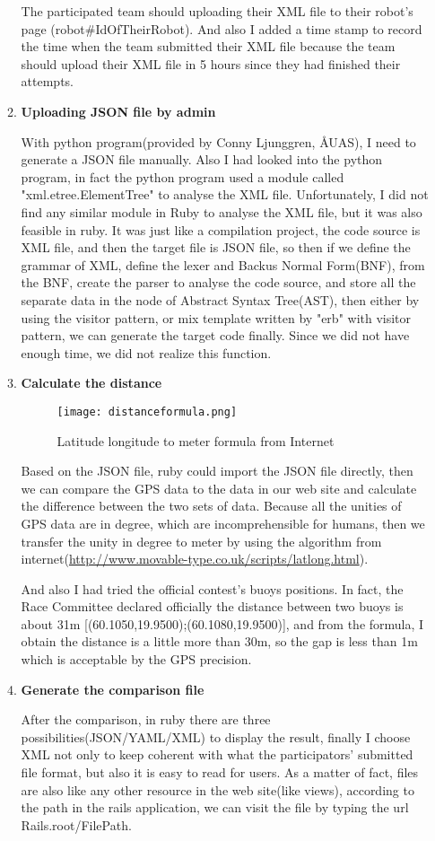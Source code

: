 \begin{itemize}
\begin{enumerate}
The participated team should uploading their XML file to their robot's page
(robot\#IdOfTheirRobot). And also I added a time stamp to record the time when the team submitted their XML file because the team should upload their XML file in 5 hours since they had finished their attempts.

\item{\textbf{Uploading JSON file by admin}}

With python program(provided by Conny Ljunggren, ÅUAS), I need to generate a JSON file manually. Also I had looked into the python program, in fact the python program used a module called "xml.etree.ElementTree" to analyse the XML file. Unfortunately, I did not find any similar module in Ruby to analyse the XML file, but it was also feasible in ruby. It was just like a compilation project, the code source is XML file, and then the target file is JSON file, so then if we define the grammar of XML, define the lexer and Backus Normal Form(BNF), from the BNF, create the parser to analyse the code source, and store all the separate data in the node of Abstract Syntax Tree(AST), then either by using the visitor pattern, or mix template written by "erb" with visitor pattern, we can generate the target code finally. Since we did not have enough time, we did not realize this function.

\item{\textbf{Calculate the distance}}
\begin{figure}[h!]
    \centering
    \texttt{[image: distanceformula.png]}
    \caption{Latitude longitude to meter formula from Internet}
    \label{fig-sample}
\end{figure}
Based on the JSON file, ruby could import the JSON file directly, then we can compare the GPS data to the data in our web site and calculate the difference between the two sets of data. Because all the unities of GPS data are in degree, which are incomprehensible for humans, then we transfer the unity in degree to meter by using the algorithm from internet(\url{http://www.movable-type.co.uk/scripts/latlong.html}).


And also I had tried the official contest's buoys positions. In fact, the Race Committee declared officially the distance between two buoys is about 31m [(60.1050,19.9500);(60.1080,19.9500)], and from the formula, I obtain the distance is a little more than 30m, so the gap is less than 1m which is acceptable by the GPS precision.
\item{\textbf{Generate the comparison file}}

After the comparison, in ruby there are three possibilities(JSON/YAML/XML) to display the result, finally I choose XML not only to keep coherent with what the participators' submitted file format, but also it is easy to read for users. As a matter of fact, files are also like any other resource in the web site(like views), according to the path in the rails application, we can visit the file by typing the url Rails.root/FilePath.
\end{enumerate}
 
\end{itemize}